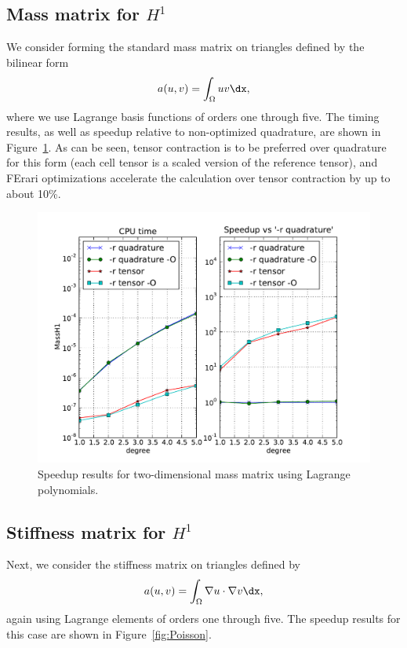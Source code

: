\subsection{Mass matrix for $H^1$}

We consider forming the standard mass matrix on triangles defined by
the bilinear form
\begin{equation} \label{eq:MassH1}
  a(u, v) = \int_{\Omega} u v \dx,
\end{equation}
where we use Lagrange basis functions of orders one through five. The
timing results, as well as speedup relative to non-optimized quadrature,
are shown in Figure~\ref{fig:MassH1}. As can be seen, tensor
contraction is to be preferred over quadrature for this form (each
cell tensor is a scaled version of the reference tensor), and FErari
optimizations accelerate the calculation over tensor contraction by up
to about 10\%.

\begin{figure}
\bwfig
  \centering
  \includegraphics[width=\largefig]{chapters/kirby-3/pdf/MassH1.pdf}
  \caption{Speedup results for two-dimensional mass matrix using Lagrange polynomials.}
  \label{fig:MassH1}
\end{figure}

\subsection{Stiffness matrix for $H^1$}

Next, we consider the stiffness matrix on triangles defined by
\begin{equation}
  a(u, v) = \int_{\Omega} \nabla u \cdot \nabla v \dx,
\end{equation}
again using Lagrange elements of orders one through five. The speedup
results for this case are shown in Figure~\ref{fig:Poisson}.

